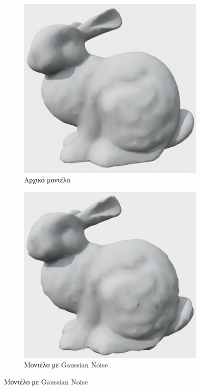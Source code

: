 \documentclass[draft]{article}
\begin{document}
\begin{figure}[h]
	\begin{subfigure}{0.5\textwidth}
		\includegraphics[width=0.9\linewidth]{"original_model.png"}
		\caption{Αρχικό μοντέλο}
	\end{subfigure}
	\begin{subfigure}{0.5\textwidth}
		\includegraphics[width=0.9\linewidth]{"gaussian_noise.png"}
		\caption{Μοντέλο με Gaussian Noise}
	\end{subfigure}

\end{figure}
\end{document}
